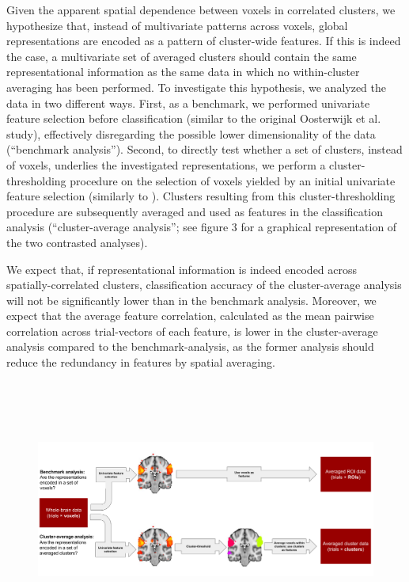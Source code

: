 \documentclass[jou,12pt,a4paper]{apa6}
\begin{document}
Given the apparent spatial dependence between voxels in correlated clusters, we hypothesize that, instead of multivariate patterns across voxels, global representations are encoded as a pattern of cluster-wide features. If this is indeed the case, a multivariate set of averaged clusters should contain the same representational information as the same data in which no within-cluster averaging has been performed. To investigate this hypothesis, we analyzed the data in two different ways. First, as a benchmark, we performed univariate feature selection before classification (similar to the original Oosterwijk et al. study), effectively disregarding the possible lower dimensionality of the data (``benchmark analysis''). Second, to directly test whether a set of clusters, instead of voxels, underlies the investigated representations, we perform a cluster-thresholding procedure on the selection of voxels yielded by an initial univariate feature selection (similarly to ). Clusters resulting from this cluster-thresholding procedure are subsequently averaged and used as features in the classification analysis (``cluster-average analysis''; see figure 3 for a graphical representation of the two contrasted analyses). 

We expect that, if representational information is indeed encoded across spatially-correlated clusters, classification accuracy of the cluster-average analysis will not be significantly lower than in the benchmark analysis. Moreover, we expect that the average feature correlation, calculated as the mean pairwise correlation across trial-vectors of each feature, is lower in the cluster-average analysis compared to the benchmark-analysis, as the former analysis should reduce the redundancy in features by spatial averaging. 

\begin{figure}[ht]
\centering
\includegraphics[width=\textwidth,height=8.5cm]{methods}
\end{figure}
\end{document}
